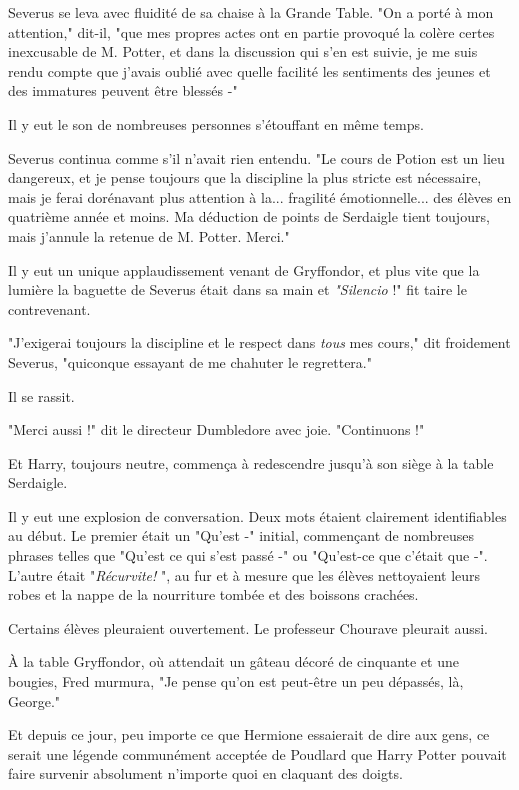 Severus se leva avec fluidité de sa chaise à la Grande Table. "On a porté à mon attention," dit-il, "que mes propres actes ont en partie provoqué la colère certes inexcusable de M. Potter, et dans la discussion qui s'en est suivie, je me suis rendu compte que j'avais oublié avec quelle facilité les sentiments des jeunes et des immatures peuvent être blessés -"

Il y eut le son de nombreuses personnes s'étouffant en même temps.

Severus continua comme s'il n'avait rien entendu. "Le cours de Potion est un lieu dangereux, et je pense toujours que la discipline la plus stricte est nécessaire, mais je ferai dorénavant plus attention à la... fragilité émotionnelle... des élèves en quatrième année et moins. Ma déduction de points de Serdaigle tient toujours, mais j'annule la retenue de M. Potter. Merci."

Il y eut un unique applaudissement venant de Gryffondor, et plus vite que la lumière la baguette de Severus était dans sa main et \emph{"Silencio}  !" fit taire le contrevenant.

"J'exigerai toujours la discipline et le respect dans \emph{tous}  mes cours," dit froidement Severus, "quiconque essayant de me chahuter le regrettera."

Il se rassit.

"Merci aussi !" dit le directeur Dumbledore avec joie. "Continuons !"

Et Harry, toujours neutre, commença à redescendre jusqu'à son siège à la table Serdaigle.

Il y eut une explosion de conversation. Deux mots étaient clairement identifiables au début. Le premier était un "Qu'est -" initial, commençant de nombreuses phrases telles que "Qu'est ce qui s'est passé -" ou "Qu'est-ce que c'était que -". L'autre était "\emph{Récurvite!} ", au fur et à mesure que les élèves nettoyaient leurs robes et la nappe de la nourriture tombée et des boissons crachées.

Certains élèves pleuraient ouvertement. Le professeur Chourave pleurait aussi.

À la table Gryffondor, où attendait un gâteau décoré de cinquante et une bougies, Fred murmura, "Je pense qu'on est peut-être un peu dépassés, là, George."

Et depuis ce jour, peu importe ce que Hermione essaierait de dire aux gens, ce serait une légende communément acceptée de Poudlard que Harry Potter pouvait faire survenir absolument n'importe quoi en claquant des doigts.

